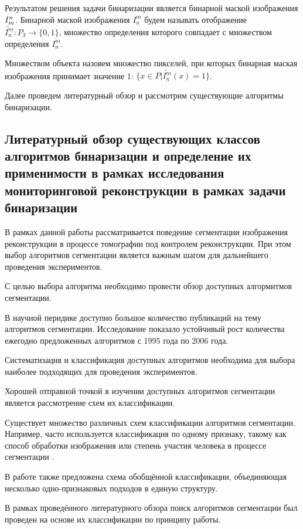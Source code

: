 Результатом решения задачи бинаризации является бинарной маской изображения \(I^n_m\).
Бинарной маской изображения \(I_n^m\) будем называть отображение \(\tilde{I_n^m} : P_3 \rightarrow \{0, 1\}\), множество определения которого совпадает с множеством определения \(I_n^m\).

Множеством объекта назовем множество пикселей, при которых бинарная маская изображения принимает значение 1: \(\{x \in P | \tilde{I_n^m}(x) = 1 \}\).

Далее проведем литературный обзор и рассмотрим существующие алгоритмы бинаризации.



\subsection{Литературный обзор существующих классов алгоритмов бинаризации и определение их применимости в рамках исследования мониторинговой реконструкции в рамках задачи бинаризации}

В рамках данной работы рассматривается поведение сегментации изображения реконструкции в процессе томографии под контролем реконструкции. При этом выбор алгоритмов сегментации является важным шагом для дальнейшего проведения экспериментов.

С целью выбора алгоритма необходимо провести обзор доступных алгормитмов сегментации.

В научной перидике доступно большое количество публикаций на тему алгоритмов сегментации. Исследование \cite{zhang2006advances} показало устойчивый рост количества ежегодно предложенных алгоритмов с 1995 года по 2006 года.

Систематизация и классификация доступных алгоритмов необходима для выбора наиболее подходящих для проведения экспериментов. 

Хорошей отправной точкой в изучении доступных алгоритмов сегментации является рассмотрение схем их классификации. 

Существует множество различных схем классификации алгоритмов сегментации. Например, часто используется классификация по одному признаку, такому как способ обработки изображения или степень участия человека в процессе сегментации \cite{wirjadi2007survey}.

В работе \cite{ханыков2018классификация} также предложена схема обобщённой классификации, объединяющая несколько одно-признаковых подходов в единую структуру.

В рамках проведённого литературного обзора поиск алгоритмов сегментации был проведен на основе их классификации по принципу работы.

